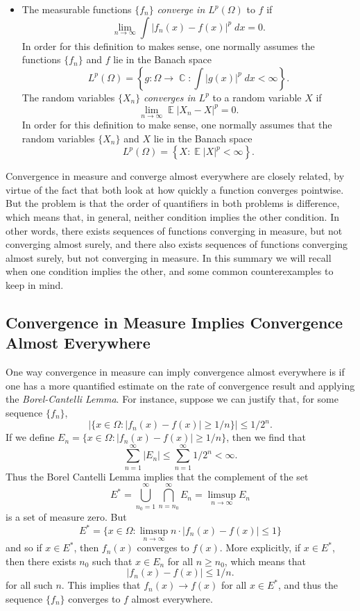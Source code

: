 \documentclass[answers]{exam}
\DeclareMathOperator{\CC}{\mathbb{C}}
\DeclareMathOperator{\EE}{\mathbb{E}}
\begin{document}
\begin{questions}
\begin{itemize}
    \item The measurable functions $\{ f_n \}$ \emph{converge in $L^p(\Omega)$} to $f$ if
    \[ \lim_{n \to \infty} \int |f_n(x) - f(x)|^p\; dx = 0. \]
    In order for this definition to makes sense, one normally assumes the functions $\{ f_n \}$ and $f$ lie in the Banach space
    \[ L^p(\Omega) = \left\{ g: \Omega \to \CC : \int |g(x)|^p\; dx < \infty \right\}. \]
    The random variables $\{ X_n \}$ \emph{converges in $L^p$} to a random variable $X$ if
    \[ \lim_{n \to \infty} \EE |X_n - X|^p = 0. \]
    In order for this definition to make sense, one normally assumes that the random variables $\{ X_n \}$ and $X$ lie in the Banach space
    \[ L^p(\Omega) = \left\{ X : \EE |X|^p < \infty \right\}. \]
\end{itemize}

Convergence in measure and converge almost everywhere are closely related, by virtue of the fact that both look at how quickly a function converges pointwise. But the problem is that the order of quantifiers in both problems is difference, which means that, in general, neither condition implies the other condition. In other words, there exists sequences of functions converging in measure, but not converging almost surely, and there also exists sequences of functions converging almost surely, but not converging in measure. In this summary we will recall when one condition implies the other, and some common counterexamples to keep in mind.

\subsection*{Convergence in Measure Implies Convergence Almost Everywhere}

One way convergence in measure can imply convergence almost everywhere is if one has a more quantified estimate on the rate of convergence result and applying the \emph{Borel-Cantelli Lemma}. For instance, suppose we can justify that, for some sequence $\{ f_n \}$,
%
\[ \Big| \{ x \in \Omega : |f_n(x) - f(x)| \geq 1/n \} \Big| \leq 1/2^n. \]
%
If we define $E_n = \{ x \in \Omega : |f_n(x) - f(x)| \geq 1/n \}$, then we find that
%
\[ \sum_{n = 1}^\infty |E_n| \leq \sum_{n = 1}^\infty 1/2^n < \infty. \]
%
Thus the Borel Cantelli Lemma implies that the complement of the set
%
\[ E^* = \bigcup_{n_0 = 1}^\infty \bigcap_{n = n_0}^\infty E_n = \limsup_{n \to \infty} E_n \]
%
is a set of measure zero. But
%
\[ E^* = \{ x \in \Omega : \limsup_{n \to \infty} n \cdot |f_n(x) - f(x)| \leq 1 \} \]
%
and so if $x \in E^*$, then $f_n(x)$ converges to $f(x)$. More explicitly, if $x \in E^*$, then there exists $n_0$ such that $x \in E_n$ for all $n \geq n_0$, which means that
%
\[ |f_n(x) - f(x)| \leq 1/n. \]
%
for all such $n$. This implies that $f_n(x) \to f(x)$ for all $x \in E^*$, and thus the sequence $\{ f_n \}$ converges to $f$ almost everywhere.


\end{questions}
\end{document}
